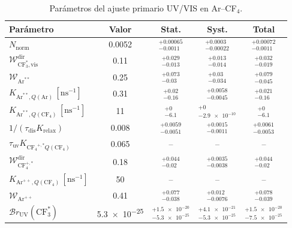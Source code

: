 \begin{table}[htbp]
\centering
\caption{Parámetros del ajuste primario UV/VIS en Ar--CF$_4$.}
\label{tab:ArCF4_primary_stat_syst}
\begin{tabular}{lcccc}
\toprule
Parámetro & Valor & Stat. & Syst. & Total \\
\midrule
$N_{\mathrm{norm}}$ & \num{0.0052} & $^{+\num{0.00065}}_{-\num{0.0011}}$ & $^{+\num{0.0003}}_{-\num{0.00022}}$ & $^{+\num{0.00072}}_{-\num{0.0011}}$ \\
$\mathcal{W}_{\mathrm{CF}_3^*,\mathrm{vis}}^{\mathrm{dir}}$ & \num{0.11} & $^{+\num{0.029}}_{-\num{0.013}}$ & $^{+\num{0.013}}_{-\num{0.014}}$ & $^{+\num{0.032}}_{-\num{0.019}}$ \\
$\mathcal{W}_{\mathrm{Ar}^{**}}$ & \num{0.25} & $^{+\num{0.073}}_{-\num{0.03}}$ & $^{+\num{0.03}}_{-\num{0.034}}$ & $^{+\num{0.079}}_{-\num{0.045}}$ \\
$K_{\mathrm{Ar}^{**},Q(\mathrm{Ar})}\,[\mathrm{ns}^{-1}]$ & \num{0.31} & $^{+\num{0.02}}_{-\num{0.16}}$ & $^{+\num{0.0058}}_{-\num{0.0045}}$ & $^{+\num{0.021}}_{-\num{0.16}}$ \\
$K_{\mathrm{Ar}^{**},Q(\mathrm{CF}_4)}\,[\mathrm{ns}^{-1}]$ & \num{11} & $^{+\num{0}}_{-\num{6.1}}$ & $^{+\num{0}}_{-\num{2.9e-10}}$ & $^{+\num{0}}_{-\num{6.1}}$ \\
$1/(\tau_{\mathrm{dis}}K_{\mathrm{relax}})$ & \num{0.008} & $^{+\num{0.0059}}_{-\num{0.0051}}$ & $^{+\num{0.0015}}_{-\num{0.0011}}$ & $^{+\num{0.0061}}_{-\num{0.0053}}$ \\
$\tau_{\mathrm{uv}}K_{\mathrm{CF_4}^{+,*}Q(\mathrm{CF}_4)}$ & \num{0.065} & -- & -- & -- \\
$\mathcal{W}_{\mathrm{CF}_4^{+,*}}^{\mathrm{dir}}$ & \num{0.18} & $^{+\num{0.044}}_{-\num{0.02}}$ & $^{+\num{0.0035}}_{-\num{0.0038}}$ & $^{+\num{0.044}}_{-\num{0.02}}$ \\
$K_{\mathrm{Ar}^{++},Q(\mathrm{CF}_4)}\,[\mathrm{ns}^{-1}]$ & \num{50} & -- & -- & -- \\
$\mathcal{W}_{\mathrm{Ar}^{++}}$ & \num{0.41} & $^{+\num{0.077}}_{-\num{0.038}}$ & $^{+\num{0.012}}_{-\num{0.0076}}$ & $^{+\num{0.078}}_{-\num{0.039}}$ \\
$\mathcal{B}r_{\mathrm{UV}}(\mathrm{CF}_3^*)$ & \num{5.3e-25} & $^{+\num{1.5e-20}}_{-\num{5.3e-25}}$ & $^{+\num{4.1e-21}}_{-\num{5.3e-25}}$ & $^{+\num{1.5e-20}}_{-\num{7.5e-25}}$ \\
\bottomrule
\end{tabular}
\end{table}
